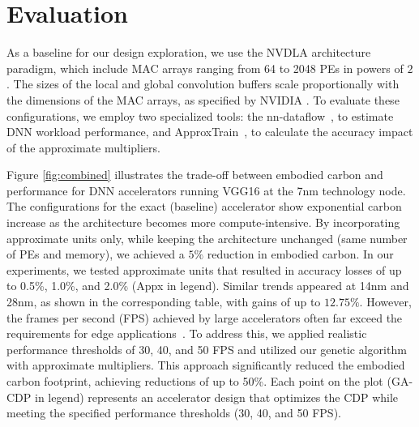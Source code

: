 
\vspace{-3pt}
\section{Evaluation}\label{sec:evaluation}
\vspace{-5pt}
As a baseline for our design exploration, we use the NVDLA architecture paradigm, which include MAC arrays ranging from 64 to 2048 PEs in powers of $2$. The sizes of the local and global convolution buffers scale proportionally with the dimensions of the MAC arrays, as specified by NVIDIA \cite{nvdla2017}. To evaluate these configurations, we employ two specialized tools: the nn-dataflow~\cite{gao2019tangram}, to estimate DNN workload performance, and ApproxTrain~\cite{gong2023approxtrain}, to calculate the accuracy impact of the approximate multipliers.

Figure \ref{fig:combined} illustrates the trade-off between embodied carbon and performance for DNN accelerators running VGG16 at the 7nm technology node. The configurations for the exact (baseline) accelerator show exponential carbon increase as the architecture becomes more compute-intensive. By incorporating approximate units only, while keeping the architecture unchanged (same number of PEs and memory), we achieved a $5\%$ reduction in embodied carbon. In our experiments, we tested approximate units that resulted in accuracy losses of up to 0.5\%, 1.0\%, and 2.0\% (Appx in legend). Similar trends appeared at 14nm and 28nm, as shown in the corresponding table, with gains of up to $12.75\%$. 
However, the frames per second (FPS) achieved by large accelerators often far exceed the requirements for edge applications~\cite{gupta2022act}. To address this, we applied realistic performance thresholds of 30, 40, and 50 FPS and utilized our genetic algorithm with approximate multipliers. This approach significantly reduced the embodied carbon footprint, achieving reductions of up to 50\%. Each point on the plot (GA-CDP in legend) represents an accelerator design that optimizes the CDP while meeting the specified performance thresholds (30, 40, and 50 FPS).



